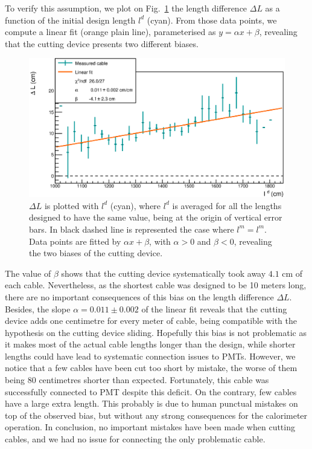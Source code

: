 To verify this assumption, we plot on Fig.~\ref{fig:CutBias} the length difference $\Delta L$ as a function of the initial design length $l^{d}$ (cyan).
From those data points, we compute a linear fit (orange plain line), parameterised as $y = \alpha x + \beta$, revealing that the cutting device presents two different biases.
\begin{figure}
  \centering
  \includegraphics[width=15cm]{commissioning/fig_commissioning/cut_biais.eps}

  \caption{$\Delta L$ is plotted with $l^{d}$ (cyan), where $l^{d}$ is averaged for all the lengths designed to have the same value, being at the origin of vertical error bars.
    In black dashed line is represented the case where $l^{m} = l^{m}$.
    Data points are fitted by $\alpha x + \beta$, with $\alpha > 0$ and $\beta < 0$, revealing the two biases of the cutting device.
    \label{fig:CutBias}}
\end{figure}
The value of $\beta$ shows that the cutting device systematically took away $4.1$ cm of each cable.
Nevertheless, as the shortest cable was designed to be 10 meters long, there are no important consequences of this bias on the length difference $\Delta L$.
Besides, the slope $\alpha = 0.011\pm 0.002$ of the linear fit reveals that the cutting device adds one centimetre for every meter of cable, being compatible with the hypothesis on the cutting device sliding.
Hopefully this bias is not problematic as it makes most of the actual cable lengths longer than the design, while shorter lengths could have lead to systematic connection issues to PMTs.
However, we notice that a few cables have been cut too short by mistake, the worse of them being $80$ centimetres shorter than expected.
Fortunately, this cable  was successfully connected to PMT despite this deficit.
On the contrary, few cables have a large extra length.
This probably is due to human punctual mistakes on top of the observed bias, but without any strong consequences for the calorimeter operation.
In conclusion, no important mistakes have been made when cutting cables, and we had no issue for connecting the only problematic cable.
\\

